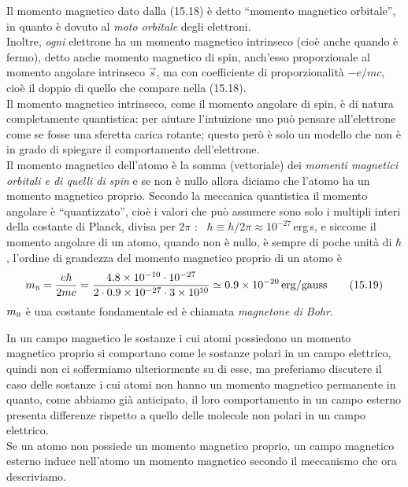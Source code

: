 Il momento magnetico dato dalla (15.18) \`e detto ``momento magnetico
orbitale'', in quanto \`e dovuto al \textit{moto orbitale} degli elettroni.\\
Inoltre, \textit{ogni} elettrone ha un momento magnetico intrinseco (cio\`e
anche quando \`e fermo), detto anche momento magnetico di spin, anch'esso
proporzionale al momento angolare intrinseco $\vec s$, ma con coefficiente di
proporzionalit\`a $-e/mc$, cio\`e il doppio di quello che compare nella
(15.18).\\
Il momento magnetico intrinseco, come il momento angolare di spin, \`e di natura
completamente quantistica: per aiutare l'intuizione uno pu\`o pensare
all'elettrone come se fosse una sferetta carica rotante; questo per\`o \`e solo
un modello che non \`e in grado di spiegare il comportamento dell'elettrone.\\
Il momento magnetico dell'atomo \`e la somma (vettoriale) dei \textit{momenti
magnetici orbitali e di quelli di spin} e se non \`e nullo allora diciamo che
l'atomo ha un momento magnetico proprio. Secondo la meccanica quantistica il
momento angolare \`e ``quantizzato'', cio\`e i valori che pu\`o assumere sono
solo i multipli interi della costante di Planck, divisa per $2\pi$ :
\ $\hbar\equiv h/2\pi\approx10^{-27}\,$erg\,s, e siccome il momento angolare di
un atomo, quando non \`e nullo, \`e sempre di poche unit\`a di $\hbar$, l'ordine
di grandezza del momento magnetico proprio di un atomo \`e
\begin{equation}
  m_{\textsc b}=\frac{e\hbar}{2mc}=\frac{4.8\times10^{-10}\cdot10^{-27}}
  {2\cdot0.9\times10^{-27}\cdot3\times10^{10}}
  \simeq0.9\times10^{-20}\,\mathrm{erg/gauss}
  \tag{15.19}
\end{equation}
$m_{\textsc b}$ \`e una costante fondamentale ed \`e chiamata \textit{magnetone
di Bohr}.

In un campo magnetico le sostanze i cui atomi possiedono un momento magnetico
proprio si comportano come le sostanze polari in un campo elettrico, quindi non
ci soffermiamo ulteriormente su di esse, ma preferiamo discutere il caso delle
sostanze i cui atomi non hanno un momento magnetico permanente in quanto, come
abbiamo gi\`a anticipato, il loro comportamento in un campo esterno presenta
differenze rispetto a quello delle molecole non polari in un campo elettrico.\\
Se un atomo non possiede un momento magnetico proprio, un campo magnetico
esterno induce nell'atomo un momento magnetico secondo il meccanismo che ora
descriviamo.

